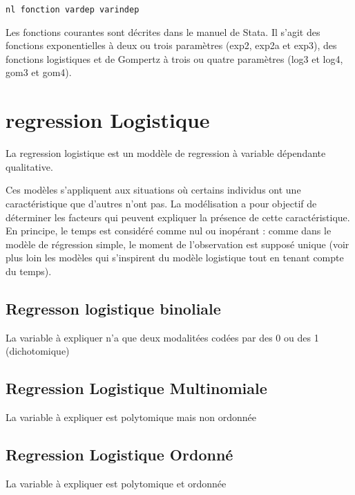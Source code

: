\documentclass[
]{book}
\begin{document}
\texttt{nl\ fonction\ vardep\ varindep}

Les fonctions courantes sont décrites dans le manuel de Stata. Il
s'agit des fonctions exponentielles à deux ou trois paramètres
(exp2, exp2a et exp3), des fonctions logistiques et de
Gompertz à trois ou quatre paramètres (log3 et log4, gom3 et
gom4).

\hypertarget{regression-logistique}{%
\section{regression Logistique}\label{regression-logistique}}

La regression logistique est un moddèle de regression à variable dépendante qualitative.

Ces modèles s'appliquent aux situations où certains individus
ont une caractéristique que d'autres n'ont pas. La modélisation a
pour objectif de déterminer les facteurs qui peuvent expliquer la
présence de cette caractéristique. En principe, le temps est
considéré comme nul ou inopérant : comme dans le modèle de
régression simple, le moment de l'observation est supposé
unique (voir plus loin les modèles qui s'inspirent du modèle
logistique tout en tenant compte du temps).

\hypertarget{regresson-logistique-binoliale}{%
\subsection{Regresson logistique binoliale}\label{regresson-logistique-binoliale}}

La variable à expliquer n'a que deux modalitées codées par des 0 ou des 1 (dichotomique)

\hypertarget{regression-logistique-multinomiale}{%
\subsection{Regression Logistique Multinomiale}\label{regression-logistique-multinomiale}}

La variable à expliquer est polytomique mais non ordonnée

\hypertarget{regression-logistique-ordonnuxe9}{%
\subsection{Regression Logistique Ordonné}\label{regression-logistique-ordonnuxe9}}

La variable à expliquer est polytomique et ordonnée
\end{document}
